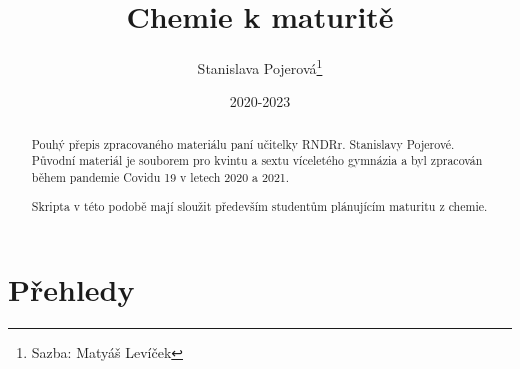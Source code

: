 \documentclass{article}
\title{Chemie k maturitě}
\author{Stanislava Pojerová\thanks{Sazba: Matyáš Levíček}}
\date{2020-2023}
\begin{document}
    \maketitle

    \begin{abstract}
        Pouhý přepis zpracovaného materiálu paní učitelky RNDRr. Stanislavy Pojerové. Původní materiál je souborem pro kvintu a sextu víceletého gymnázia a byl zpracován během pandemie Covidu 19 v letech 2020 a 2021.
        
        Skripta v této podobě mají sloužit především studentům plánujícím maturitu z chemie. 
    \end{abstract}

    \newpage
    \renewcommand{\contentsname}{Obsah podle tématu}
    \tableofcontents
    \newpage
    
    
    
    
    
    
\newlength\origheight
\setlength\origheight{\textheight}

\section{Přehledy}
    
\end{document}
